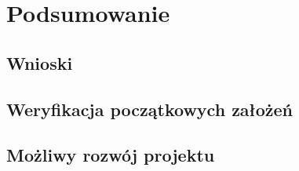 \chapter{Podsumowanie}
\label{cha:podsumowanie}
\section{Wnioski}
\section{Weryfikacja początkowych założeń}
\section{Możliwy rozwój projektu}

